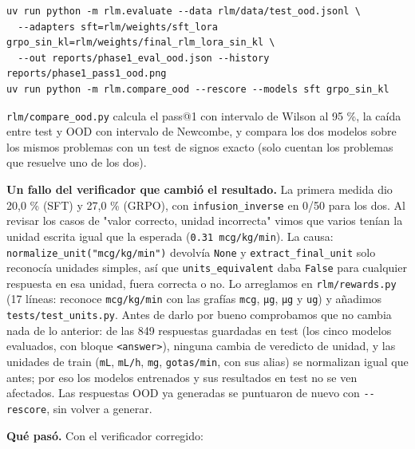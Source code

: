 \begin{lstlisting}
uv run python -m rlm.evaluate --data rlm/data/test_ood.jsonl \
  --adapters sft=rlm/weights/sft_lora grpo_sin_kl=rlm/weights/final_rlm_lora_sin_kl \
  --out reports/phase1_eval_ood.json --history reports/phase1_pass1_ood.png
uv run python -m rlm.compare_ood --rescore --models sft grpo_sin_kl
\end{lstlisting}

\texttt{rlm/\allowbreak{}compare\_\allowbreak{}ood.py} calcula el pass@1 con intervalo de Wilson al 95 \%, la caída entre test y OOD
con intervalo de Newcombe, y compara los dos modelos sobre los mismos problemas con un test de
signos exacto (solo cuentan los problemas que resuelve uno de los dos).

\textbf{Un fallo del verificador que cambió el resultado.} La primera medida dio 20,0 \% (SFT) y 27,0 \%
(GRPO), con \texttt{infusion\_\allowbreak{}inverse} en 0/50 para los dos. Al revisar los casos de "valor correcto,
unidad incorrecta" vimos que varios tenían la unidad escrita igual que la esperada
(\texttt{0.31 mcg/\allowbreak{}kg/\allowbreak{}min}). La causa: \texttt{normalize\_\allowbreak{}unit("mcg/\allowbreak{}kg/\allowbreak{}min")} devolvía \texttt{None} y
\texttt{extract\_\allowbreak{}final\_\allowbreak{}unit} solo reconocía unidades simples, así que \texttt{units\_\allowbreak{}equivalent} daba \texttt{False}
para cualquier respuesta en esa unidad, fuera correcta o no. Lo arreglamos en \texttt{rlm/\allowbreak{}rewards.py}
(17 líneas: reconoce \texttt{mcg/\allowbreak{}kg/\allowbreak{}min} con las grafías \texttt{mcg}, \texttt{µg}, \texttt{μg} y \texttt{ug}) y añadimos
\texttt{tests/\allowbreak{}test\_\allowbreak{}units.py}. Antes de darlo por bueno comprobamos que no cambia nada de lo anterior:
de las 849 respuestas guardadas en test (los cinco modelos evaluados, con bloque \texttt{\textless{}answer\textgreater{}}),
ninguna cambia de veredicto de unidad, y las unidades de train (\texttt{mL}, \texttt{mL/\allowbreak{}h}, \texttt{mg},
\texttt{gotas/\allowbreak{}min}, con sus alias) se normalizan igual que antes; por eso los modelos entrenados y sus
resultados en test no se ven afectados. Las respuestas OOD ya generadas se puntuaron de nuevo
con \texttt{-\/\allowbreak{}-rescore}, sin volver a generar.

\textbf{Qué pasó.} Con el verificador corregido:

